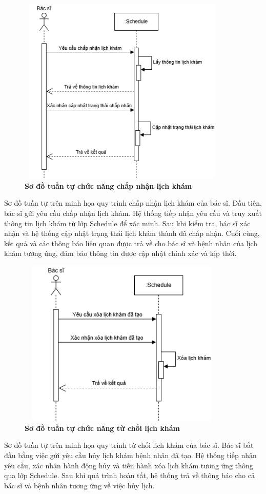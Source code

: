\begin{figure}[H]
	\centering
	\includegraphics[width=10cm,height=9cm]{Images/sequence/schedule/accept.drawio.png}
	\caption[Sơ đồ tuần tự chức năng chấp nhận lịch khám]{\bfseries \fontsize{12pt}{0pt}
		\selectfont Sơ đồ tuần tự chức năng chấp nhận lịch khám}
	\label{sequence_accept} %
\end{figure}
Sơ đồ tuần tự trên minh họa quy trình chấp nhận lịch khám của bác sĩ. Đầu tiên, bác sĩ gửi yêu cầu chấp nhận lịch khám.
Hệ thống tiếp nhận yêu cầu và truy xuất thông tin lịch khám từ lớp Schedule để xác minh. Sau khi kiểm tra, bác sĩ xác nhận và hệ thống cập nhật trạng thái lịch khám thành đã chấp nhận.
Cuối cùng, kết quả và các thông báo liên quan được trả về cho bác sĩ và bệnh nhân của lịch khám tương ứng, đảm bảo thông tin được cập nhật chính xác và kịp thời.

\begin{figure}[H]
	\centering
	\includegraphics[width=10cm,height=8cm]{Images/sequence/schedule/delete.drawio.png}
	\caption[Sơ đồ tuần tự chức năng từ chối lịch khám]{\bfseries \fontsize{12pt}{0pt}
		\selectfont Sơ đồ tuần tự chức năng từ chối lịch khám}
	\label{sequence_reject} %
\end{figure}
Sơ đồ tuần tự trên minh họa quy trình từ chối lịch khám của bác sĩ. Bác sĩ bắt đầu bằng việc gửi yêu cầu hủy lịch khám bệnh nhân đã tạo. 
Hệ thống tiếp nhận yêu cầu, xác nhận hành động hủy và tiến hành xóa lịch khám tương ứng thông qua lớp Schedule.
Sau khi quá trình hoàn tất, hệ thống trả về thông báo cho cả bác sĩ và bệnh nhân tương ứng về việc hủy lịch.

